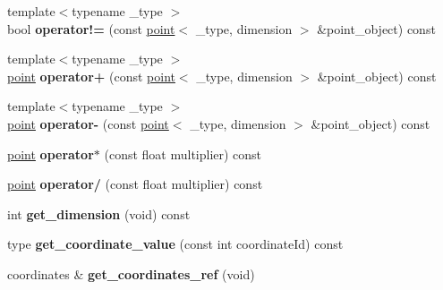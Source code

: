 \begin{DoxyCompactItemize}
\item 
\hypertarget{classxstd_1_1point_a41ffcfd2fbb0420aceb7a3d81950e945}{{\footnotesize template$<$typename \-\_\-type $>$ }\\bool {\bfseries operator!=} (const \hyperlink{classxstd_1_1point}{point}$<$ \-\_\-type, dimension $>$ \&point\-\_\-object) const }\label{classxstd_1_1point_a41ffcfd2fbb0420aceb7a3d81950e945}

\item 
\hypertarget{classxstd_1_1point_aae13ce0401101be7b26121f8be146f4b}{{\footnotesize template$<$typename \-\_\-type $>$ }\\\hyperlink{classxstd_1_1point}{point} {\bfseries operator+} (const \hyperlink{classxstd_1_1point}{point}$<$ \-\_\-type, dimension $>$ \&point\-\_\-object) const }\label{classxstd_1_1point_aae13ce0401101be7b26121f8be146f4b}

\item 
\hypertarget{classxstd_1_1point_ad1af00d4517e769e7da57cd26732a6ab}{{\footnotesize template$<$typename \-\_\-type $>$ }\\\hyperlink{classxstd_1_1point}{point} {\bfseries operator-\/} (const \hyperlink{classxstd_1_1point}{point}$<$ \-\_\-type, dimension $>$ \&point\-\_\-object) const }\label{classxstd_1_1point_ad1af00d4517e769e7da57cd26732a6ab}

\item 
\hypertarget{classxstd_1_1point_ac777d5594b34c30fe27bcd549ef89be4}{\hyperlink{classxstd_1_1point}{point} {\bfseries operator$\ast$} (const float multiplier) const }\label{classxstd_1_1point_ac777d5594b34c30fe27bcd549ef89be4}

\item 
\hypertarget{classxstd_1_1point_aa96d22aaf0a1687325dadaa832740c3e}{\hyperlink{classxstd_1_1point}{point} {\bfseries operator/} (const float multiplier) const }\label{classxstd_1_1point_aa96d22aaf0a1687325dadaa832740c3e}

\item 
\hypertarget{classxstd_1_1point_a766d0887be589b7448696e0c0b00d557}{int {\bfseries get\-\_\-dimension} (void) const }\label{classxstd_1_1point_a766d0887be589b7448696e0c0b00d557}

\item 
\hypertarget{classxstd_1_1point_ae0363f79e01bb646555c51dfd99444ca}{type {\bfseries get\-\_\-coordinate\-\_\-value} (const int coordinate\-Id) const }\label{classxstd_1_1point_ae0363f79e01bb646555c51dfd99444ca}

\item 
\hypertarget{classxstd_1_1point_a812c6e9c6b5e329897fbab3ccce407e7}{coordinates \& {\bfseries get\-\_\-coordinates\-\_\-ref} (void)}\label{classxstd_1_1point_a812c6e9c6b5e329897fbab3ccce407e7}


\end{DoxyCompactItemize}
